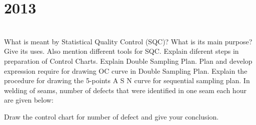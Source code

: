 \section*{2013}
\vspace{-.5cm}
\hrulefill \smallskip\\
 What is meant by Statistical Quality Control (SQC)? What is its main purpose? Give its uses. Also mention different tools for SQC.
\myline
{} Explain diferent steps in preparation of Control Charts.
\myline
{} Explain Double Sampling Plan. Plan and develop expression require for drawing OC curve in Double Sampling Plan.
\myline
{} Explain the procedure for drawing the 5-points A S N curve for sequential sampling plan.
\myline
{} In welding of seams, number of defects that were identified in one seam each hour are given below:
\vspace{-1.5em}
\begin{center}
\end{center}
\begin{center}
\end{center}
 Draw the control chart for number of defect and give your conclusion.